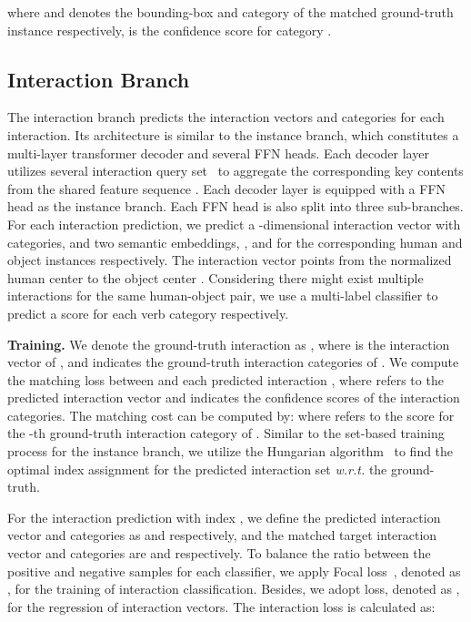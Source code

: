 \documentclass[final]{cvpr}
\begin{document}
where  and  denotes the bounding-box and category of the matched ground-truth instance respectively,  is the confidence score for category .
\vspace{-1.5mm}\subsection{Interaction Branch}\vspace{-1mm} \label{sec:interaction}
The interaction branch predicts the interaction vectors and categories for each interaction. Its architecture is similar to the instance branch, which constitutes a multi-layer transformer decoder and several FFN heads. Each decoder layer utilizes several interaction query set~ to aggregate the corresponding key contents  from the shared feature sequence . 
Each decoder layer is equipped with a FFN head as the instance branch. Each FFN head is also split into three sub-branches. For each interaction prediction, we predict a -dimensional interaction vector with categories, and two semantic embeddings, \ie,  and  for the corresponding human and object instances respectively. The interaction vector points from the normalized human center  to the object center . Considering there might exist multiple interactions for the same human-object pair, we use a multi-label classifier to predict a score for each verb category respectively.

\vspace{0.5mm}\noindent\textbf{Training.} We denote the ground-truth interaction as , where  is the interaction vector of , and  indicates the  ground-truth interaction categories of . We compute the matching loss between  and each predicted interaction , where  refers to the predicted interaction vector and  indicates the confidence scores of the interaction categories. The matching cost  can be computed by:
 \vspace{-1mm}
where  refers to the score for the -th ground-truth interaction category  of . Similar to the set-based training process for the instance branch, we utilize the Hungarian algorithm~\cite{hungarian} to find the optimal index assignment  for the predicted interaction set \emph{w.r.t.} the ground-truth.

For the interaction prediction with index , we define the predicted interaction vector and categories as  and  respectively, and the matched target interaction vector and categories are  and  respectively. To balance the ratio between the positive and negative samples for each classifier, we apply Focal loss~\cite{lin2017focal}, denoted as , for the training of interaction classification. Besides, we adopt  loss, denoted as , for the regression of interaction vectors. The interaction loss  is calculated as:
\end{document}
